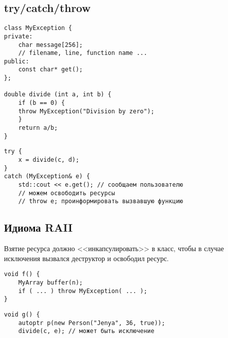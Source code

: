 \subsection{try/catch/throw}


\begin{minipage}{0.45\textwidth}
\begin{verbatim}
class MyException {
private:
    char message[256];
    // filename, line, function name ... 
public:
    const char* get();
};

double divide (int a, int b) {
    if (b == 0) {
	throw MyException("Division by zero");
    }
    return a/b;
}
\end{verbatim}
\end{minipage}
\hfill
\begin{minipage}{0.5\textwidth}
\begin{verbatim}
try {
    x = divide(c, d);
}
catch (MyException& e) {
    std::cout << e.get(); // сообщаем пользователю
    // можем освободить ресурсы
    // throw e; проинформировать вызвавшую функцию
\end{verbatim}
\end{minipage}
\subsection{Идиома RAII}
Взятие ресурса должно <<инкапсулировать>> в класс, чтобы в случае исключения вызвался деструктор и освободил ресурс.

\begin{minipage}{0.45\textwidth}
\begin{verbatim}
void f() {
    MyArray buffer(n);
    if ( ... ) throw MyException( ... );
}
\end{verbatim}
\end{minipage}
\hfill
\begin{minipage}{0.45\textwidth}
    \begin{verbatim}
void g() {
    autoptr p(new Person("Jenya", 36, true));
    divide(c, e); // может быть исключение
    \end{verbatim}
\end{minipage}

